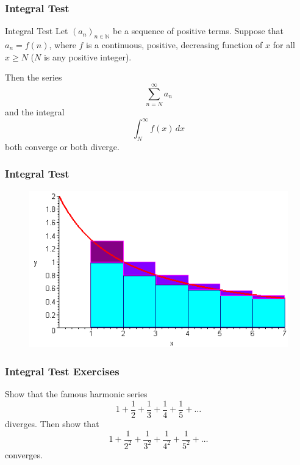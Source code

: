 \documentclass[xcolor=dvipsnames]{beamer}
\begin{document}
\begin{frame}
  \frametitle{Integral Test}
  \begin{block}{Integral Test}
    Let $\left(a_{n}\right)_{n\in\mathbb{N}}$ be a sequence of
    positive terms. Suppose that $a_{n}=f(n)$, where $f$ is a
    continuous, positive, decreasing function of $x$ for all
    $x\geq{}N$ ($N$ is any positive integer). 
  \end{block}
  Then the series
  \begin{equation}
    \label{eq:aegahiox}
    \sum_{n=N}^{\infty}a_{n}
  \end{equation}
  and the integral
  \begin{equation}
    \label{eq:iopheigh}
    \int_{N}^{\infty}f(x)\,dx
  \end{equation}
both converge or both diverge.
\end{frame}

\begin{frame}
  \frametitle{Integral Test}
  \begin{figure}[h]
    \includegraphics[scale=0.6]{./diagrams/inttes1.png}
  \end{figure}
\end{frame}

\begin{frame}
  \frametitle{Integral Test Exercises}
  Show that the famous harmonic series
  \begin{equation}
    \label{eq:paipawai}
    1+\frac{1}{2}+\frac{1}{3}+\frac{1}{4}+\frac{1}{5}+{\ldots}
  \end{equation}
  diverges. Then show that
  \begin{equation}
    \label{eq:aiphohai}
    1+\frac{1}{2^{2}}+\frac{1}{3^{2}}+\frac{1}{4^{2}}+\frac{1}{5^{2}}+{\ldots}
  \end{equation}
  converges. 
\end{frame}
\end{document}
